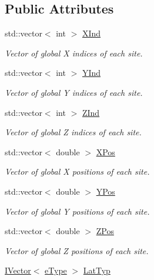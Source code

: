 \subsection*{Public Attributes}
\begin{DoxyCompactItemize}
\item 
std\+::vector$<$ int $>$ \hyperlink{class_grid_obj_ad9bb2153aec972c499ce969a76d908fd}{X\+Ind}
\begin{DoxyCompactList}\small\item\em Vector of global X indices of each site. \end{DoxyCompactList}\item 
std\+::vector$<$ int $>$ \hyperlink{class_grid_obj_acf1d07b290887f0d380d046a1d698f0e}{Y\+Ind}
\begin{DoxyCompactList}\small\item\em Vector of global Y indices of each site. \end{DoxyCompactList}\item 
std\+::vector$<$ int $>$ \hyperlink{class_grid_obj_aef85a27cb2bca6b268469ee96470bb35}{Z\+Ind}
\begin{DoxyCompactList}\small\item\em Vector of global Z indices of each site. \end{DoxyCompactList}\item 
std\+::vector$<$ double $>$ \hyperlink{class_grid_obj_af31df133bf9419da6222a0dbb4e54bab}{X\+Pos}
\begin{DoxyCompactList}\small\item\em Vector of global X positions of each site. \end{DoxyCompactList}\item 
std\+::vector$<$ double $>$ \hyperlink{class_grid_obj_a2bd4e9b575377b8e76e5ebe7a3a31194}{Y\+Pos}
\begin{DoxyCompactList}\small\item\em Vector of global Y positions of each site. \end{DoxyCompactList}\item 
std\+::vector$<$ double $>$ \hyperlink{class_grid_obj_af859d35bf0a03cee8965ce3e22e651c6}{Z\+Pos}
\begin{DoxyCompactList}\small\item\em Vector of global Z positions of each site. \end{DoxyCompactList}\item 
\hyperlink{class_i_vector}{I\+Vector}$<$ \hyperlink{_grid_obj_8h_a12f8ec8f0e7a4584b9fe481bb53fa60e}{e\+Type} $>$ \hyperlink{class_grid_obj_a8ce077fba648f767361039eb924c45ae}{Lat\+Typ}

\end{DoxyCompactItemize}
